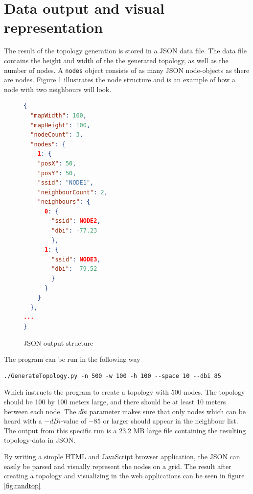 			\section{Data output and visual representation} \label{simulationrep}
			The result of the topology generation is stored in a JSON\cite{JSON} data file. The data file contains the height and width of the the generated topology, as well
			as the number of nodes. A \verb|nodes| object consists of as many JSON node-objects as there are nodes. Figure \ref{fig:nodeStruct} illustrates the node structure
			and is an example of how a node with two neighbours will look.
			\begin{figure}[H]
			\begin{minipage}{\linewidth}
			\begin{lstlisting}[language=json]
{
  "mapWidth": 100,
  "mapHeight": 100,
  "nodeCount": 3,
  "nodes": {
    1: {
    "posX": 50,
    "posY": 50, 
    "ssid": "NODE1", 
    "neighbourCount": 2, 
    "neighbours": {
      0: {
        "ssid": NODE2,
        "dbi": -77.23
        },
      1: {
        "ssid": NODE3,
        "dbi": -79.52
        }
      }
    }
  },
...
}
\end{lstlisting}
\end{minipage}
\caption{JSON output structure}
\label{fig:nodeStruct}

\end{figure}
The program can be run in the following way
\begin{verbatim}./GenerateTopology.py -n 500 -w 100 -h 100 --space 10 --dbi 85 \end{verbatim}
Which instructs the program to create a topology with 500 nodes. The topology should be 100 by 100 meters large, and there should be at least 10 meters
between each node. The $dbi$ parameter makes sure that only nodes which can be heard with a $-dBi$-value of $-85$ or larger should appear in the neighbour list. 
The output from this specific run is a 23.2 MB large file containing the resulting topology-data in JSON.

By writing a simple HTML and JavaScript browser application, the JSON can easily be parsed and visually represent the nodes on a grid.
The result after creating a topology and visualizing in the web applications can be seen in figure \ref{fig:randtop}

